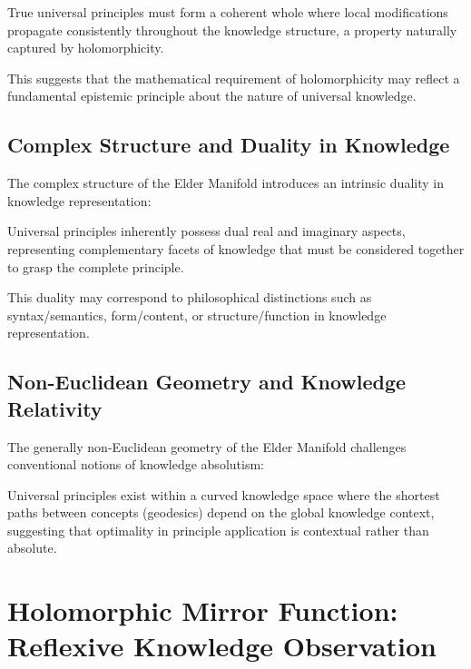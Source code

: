 \begin{proposition}
True universal principles must form a coherent whole where local modifications propagate consistently throughout the knowledge structure, a property naturally captured by holomorphicity.
\end{proposition}

This suggests that the mathematical requirement of holomorphicity may reflect a fundamental epistemic principle about the nature of universal knowledge.

\subsection{Complex Structure and Duality in Knowledge}

The complex structure of the Elder Manifold introduces an intrinsic duality in knowledge representation:

\begin{proposition}
Universal principles inherently possess dual real and imaginary aspects, representing complementary facets of knowledge that must be considered together to grasp the complete principle.
\end{proposition}

This duality may correspond to philosophical distinctions such as syntax/semantics, form/content, or structure/function in knowledge representation.

\subsection{Non-Euclidean Geometry and Knowledge Relativity}

The generally non-Euclidean geometry of the Elder Manifold challenges conventional notions of knowledge absolutism:

\begin{proposition}
Universal principles exist within a curved knowledge space where the shortest paths between concepts (geodesics) depend on the global knowledge context, suggesting that optimality in principle application is contextual rather than absolute.
\end{proposition}

\section{Holomorphic Mirror Function: Reflexive Knowledge Observation}

